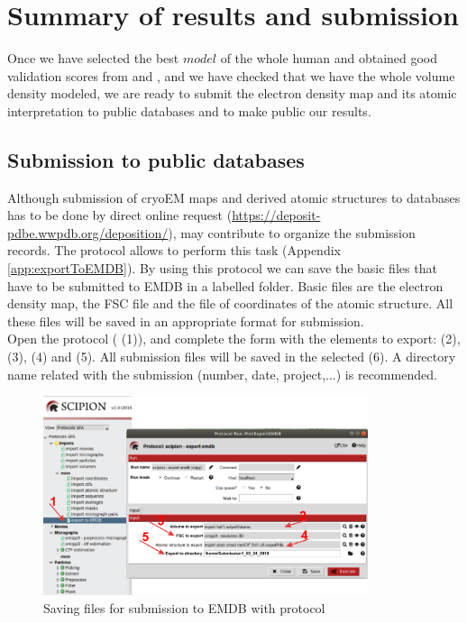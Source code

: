 \section{Summary of results and submission}

Once we have selected the best $model$ of the whole human  and obtained good validation scores from \emringer and \molprobity, and we have checked that we have the whole volume density modeled, we are ready to submit the electron density map and its atomic interpretation to public databases and to make public our results.\\

\subsection*{Submission to public databases}

Although submission of cryoEM maps and derived atomic structures to databases has to be done by direct online request (\url{https://deposit-pdbe.wwpdb.org/deposition/}), \scipion may contribute to organize the submission records. The protocol  allows to perform this task (Appendix \ref{app:exportToEMDB}). By using this protocol we can save the basic files that have to be submitted to EMDB in a labelled folder. Basic files are the electron density map, the FSC file and the file of coordinates of the atomic structure. All these files will be saved in an appropriate format for submission.\\

Open the  protocol ( (1)), and complete the form with the \scipion elements to export:  (2),  (3),  (4) and  (5). All submission files will be saved in the  selected (6). A directory name related with the submission (number, date, project,...) is recommended. 
 
 \begin{figure}[H]
  \centering 
  \captionsetup{width=.7\linewidth} 
  \includegraphics[width=0.85\textwidth]{Images/Fig45}
  \caption{Saving files for submission to EMDB with protocol }
  \label{fig:export_to_EMDB_protocol}
  \end{figure}
  
